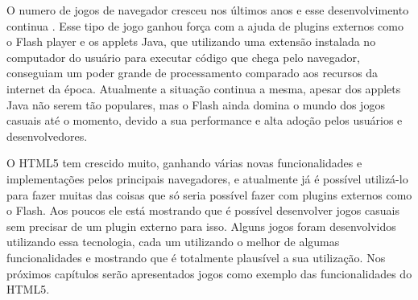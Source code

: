 O numero de jogos de navegador cresceu nos últimos anos e esse
desenvolvimento continua \cite{ozcan2010recent}. Esse tipo de jogo
ganhou força com a ajuda de plugins externos como o Flash player e
os applets Java, que utilizando uma extensão instalada no computador
do usuário para executar código que chega pelo navegador,
conseguiam um poder grande de processamento comparado aos
recursos da internet da época.
Atualmente a situação continua a mesma, apesar dos applets Java não
serem tão populares, mas o Flash ainda domina o mundo dos jogos
casuais até o momento, devido a sua performance e alta adoção pelos
usuários e desenvolvedores.

O HTML5 tem crescido muito, ganhando várias novas funcionalidades e
implementações pelos principais navegadores, e atualmente já é possível utilizá-lo
para fazer muitas das coisas que só seria possível fazer com plugins
externos como o Flash. Aos poucos ele está mostrando que é possível
desenvolver jogos casuais sem precisar de um plugin externo para isso.
Alguns jogos foram desenvolvidos utilizando essa tecnologia, cada um
utilizando o melhor de algumas funcionalidades e mostrando que é
totalmente plausível a sua utilização. Nos próximos capítulos serão
apresentados jogos como exemplo das funcionalidades do HTML5.
